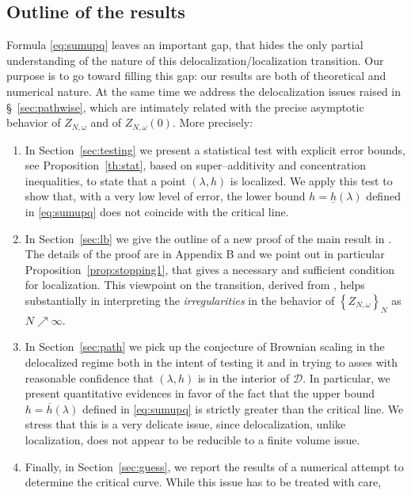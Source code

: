 \documentclass[reqno,11pt]{amsart}
\numberwithin{equation}{section}
\newcommand{\cD}{{\ensuremath{\mathcal D}} }
\newcommand{\go}{\omega}
\newcommand{\gl}{\lambda}
\begin{document}
\subsection{Outline of the results}
\label{sec:Outline}


Formula \eqref{eq:sumupq} leaves an important gap, that
hides the only partial understanding of the nature of this delocalization/localization
transition.
Our purpose is to go toward filling this gap: our results are both of theoretical and numerical nature.
At the same time we address the delocalization issues raised
in \S~\ref{sec:pathwise}, which are intimately related with the precise
asymptotic behavior of $Z_{N,\go}$ and of  $Z_{N,\go}(0)$.
More precisely:

 \medskip
 \begin{enumerate}
 \item In Section~\ref{sec:testing} we present a statistical test with explicit error bounds, see Proposition~\ref{th:stat}, based on
 super--additivity and concentration inequalities, to state that a point $(\gl, h)$ is localized. We apply this test to show that, with a very low level of error, the lower bound $h=\underline h(\gl)$ defined in \eqref{eq:sumupq} does not coincide with the critical line.
 \item In Section~\ref{sec:lb} we give the outline of a new proof of the main
 result in \cite{cf:BG2}. The details of the proof are in Appendix B and we point out
 in particular Proposition~\ref{prop:stopping1}, that gives a necessary and sufficient
 condition for localization. This viewpoint on the transition, derived from
 \cite[Section~4]{cf:GT}, helps substantially in interpreting the {\sl irregularities} in the
 behavior  of $\left\{ Z_{N, \go}\right\}_N$ as $N \nearrow \infty$.
 \item In Section~\ref{sec:path} we pick up the conjecture of Brownian scaling
 in the delocalized regime both in the intent of testing it and
 in trying to asses with reasonable confidence that $(\gl, h)$ is in the interior
 of $\cD$. In particular, we present quantitative evidences in favor of the fact that the upper bound $h= \overline h (\gl)$ defined in \eqref{eq:sumupq} is strictly greater than the critical line. We stress that this is a very delicate issue, since delocalization, unlike
 localization, does not appear to be reducible to a finite volume issue.
 \item Finally, in Section~\ref{sec:guess}, we report the results of a numerical attempt
 to determine the critical curve. While this issue has to be treated with care,

\end{enumerate}
\end{document}
